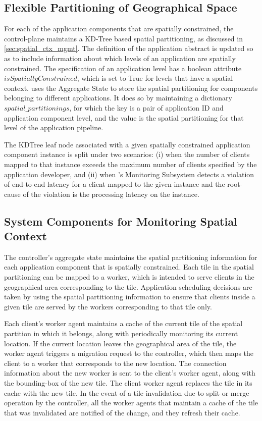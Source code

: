 \subsection{Flexible Partitioning of Geographical Space}
For each of the application components that are spatially constrained, the control-plane maintains a KD-Tree based spatial partitioning, as discussed in \cref{sec:spatial_ctx_mgmt}. The definition of the application abstract is updated so as to include information about which levels of an application are spatially constrained. The specification of an application level has a boolean attribute $isSpatiallyConstrained$, which is set to True for levels that have a spatial context. \oneedge{} uses the Aggregate State to store the spatial partitioning for components belonging to different applications. It does so by maintaining a dictionary $spatial\_partitionings$, for which the key is a pair of application ID and application component level, and the value is the spatial partitioning for that level of the application pipeline.
\par The KDTree leaf node associated with a given spatially constrained application component instance is split under two scenarios: (i) when the number of clients mapped to that instance exceeds the maximum number of clients specified by the application developer, and (ii) when \oneedge{}'s Monitoring Subsystem detects a violation of end-to-end latency for a client mapped to the given instance and the root-cause of the violation is the processing latency on the instance.

\subsection{System Components for Monitoring Spatial Context}

The controller's aggregate state maintains the spatial partitioning information for each application component that is spatially constrained. Each tile in the spatial partitioning can be mapped to a worker, which is intended to serve clients in the geographical area corresponding to the tile. Application scheduling decisions are taken by using the spatial partitioning information to ensure that clients inside a given tile are served by the workers corresponding to that tile only. 
\par Each client's worker agent maintains a cache of the current tile of the spatial partition in which it belongs, along with periodically monitoring its current location. If the current location leaves the geographical area of the tile, the worker agent triggers a migration request to the controller, which then maps the client to a worker that corresponds to the new location. The connection information about the new worker is sent to the client's worker agent, along with the bounding-box of the new tile. The client worker agent replaces the tile in its cache with the new tile. In the event of a tile invalidation due to split or merge operation by the controller, all the worker agents that maintain a cache of the tile that was invalidated are notified of the change, and they refresh their cache.

